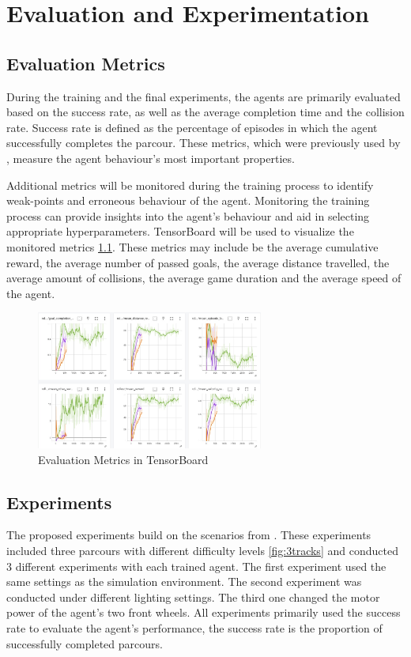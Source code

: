 \chapter{Evaluation and Experimentation}

\section{Evaluation Metrics}

During the training and the final experiments, the agents are primarily evaluated based on the success rate, as well as the average completion time and the collision rate. Success rate is defined as the percentage of episodes in which the agent successfully completes the parcour. These metrics, which were previously used by \autocite{maximilian}, measure the agent behaviour's most important properties.

Additional metrics will be monitored during the training process to identify weak-points and erroneous behaviour of the agent. Monitoring the training process can provide insights into the agent's behaviour and aid in selecting appropriate hyperparameters. TensorBoard will be used to visualize the monitored metrics \ref{fig:tensorboard}.
These metrics may include be the average cumulative reward, the average number of passed goals, the average distance travelled, the average amount of collisions, the average game duration and the average speed of the agent.

\begin{figure}
    \centering
    \includegraphics[width=0.666\textwidth]{Bilder/tensorboard2.jpg}
    \caption{Evaluation Metrics in TensorBoard}
    \label{fig:tensorboard}
\end{figure}


\section{Experiments}

The proposed experiments build on the scenarios from \autocite{maximilian}. These experiments included three parcours with different difficulty levels \ref{fig:3tracks} and conducted 3 different experiments with each trained agent. The first experiment used the same settings as the simulation environment. The second experiment was conducted under different lighting settings. The third one changed the motor power of the agent's two front wheels. All experiments primarily used the success rate to evaluate the agent's performance, the success rate is the proportion of successfully completed parcours.

